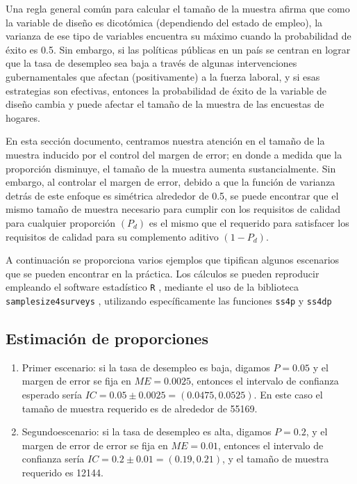 \documentclass[
  12pt,
]{book}
\begin{document}
Una regla general común para calcular el tamaño de la muestra afirma que como la variable de diseño es dicotómica (dependiendo del estado de empleo), la varianza de ese tipo de variables encuentra su máximo cuando la probabilidad de éxito es 0.5. Sin embargo, si las políticas públicas en un país se centran en lograr que la tasa de desempleo sea baja a través de algunas intervenciones gubernamentales que afectan (positivamente) a la fuerza laboral, y si esas estrategias son efectivas, entonces la probabilidad de éxito de la variable de diseño cambia y puede afectar el tamaño de la muestra de las encuestas de hogares.

En esta sección documento, centramos nuestra atención en el tamaño de la muestra inducido por el control del margen de error; en donde a medida que la proporción disminuye, el tamaño de la muestra aumenta sustancialmente. Sin embargo, al controlar el margen de error, debido a que la función de varianza detrás de este enfoque es simétrica alrededor de 0.5, se puede encontrar que el mismo tamaño de muestra necesario para cumplir con los requisitos de calidad para cualquier proporción \((P_d)\) es el mismo que el requerido para satisfacer los requisitos de calidad para su complemento aditivo \((1 - P_d)\).

A continuación se proporciona varios ejemplos que tipifican algunos escenarios que se pueden encontrar en la práctica. Los cálculos se pueden reproducir empleando el software estadístico \texttt{R} \citep{R2020}, mediante el uso de la biblioteca \texttt{samplesize4surveys} \citep{ss4s}, utilizando específicamente las funciones \texttt{ss4p} y \texttt{ss4dp}

\hypertarget{estimaciuxf3n-de-proporciones}{%
\subsection{Estimación de proporciones}\label{estimaciuxf3n-de-proporciones}}

\begin{enumerate}
\def\labelenumi{\arabic{enumi}.}
\item
  Primer escenario: si la tasa de desempleo es baja, digamos \({P}=0.05\) y el margen de error se fija en \(ME = 0.0025\), entonces el intervalo de confianza esperado sería \(IC=0.05\pm0.0025=(0.0475,0.0525)\). En este caso el tamaño de muestra requerido es de alrededor de 55169.
\item
  Segundoescenario: si la tasa de desempleo es alta, digamos \({P}=0.2\), y el margen de error de error se fija en \(ME = 0.01\), entonces el intervalo de confianza sería \(IC=0.2\pm0.01=(0.19,0.21)\), y el tamaño de muestra requerido es 12144.
\end{enumerate}
\end{document}
